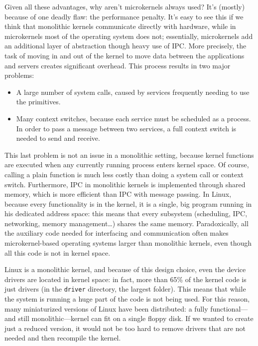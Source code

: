 Given all these advantages, why aren't microkernels always used? It's (mostly) because of one deadly flaw: the performance penalty. It's easy to see this if we think that monolithic kernels communicate directly with hardware, while in microkernels most of the operating system does not; essentially, microkernels add an additional layer of abstraction though heavy use of IPC. More precisely, the task of moving in and out of the kernel to move data between the applications and servers creates significant overhead. This process results in two major problems:
\begin{itemize}
\item A large number of system calls, caused by services frequently needing to use the primitives.
\item Many context switches, because each service must be scheduled as a process. In order to pass a message between two services, a full context switch is needed to send and receive.
\end{itemize}
This last problem is not an issue in a monolithic setting, because kernel functions are executed when any currently running process enters kernel space. Of course, calling a plain function is much less costly than doing a system call or context switch. Furthermore, IPC in monolithic kernels is implemented through shared memory, which is more efficient than IPC with message passing. In Linux, because every functionality is in the kernel, it is a single, big program running in his dedicated address space: this means that every subsystem (scheduling, IPC, networking, memory management\dots) shares the same memory. Paradoxically, all the auxiliary code needed for interfacing and communication often makes microkernel-based operating systems larger than monolithic kernels, even though all this code is not in kernel space. 

Linux is a monolithic kernel, and because of this design choice, even the device drivers are located in kernel space: in fact, more than 65\% of the kernel code is just drivers (in the \verb|driver| directory, the largest folder). This means that while the system is running a huge part of the code is not being used. For this reason, many miniaturized versions of Linux have been distributed: a fully functional---and still monolithic---kernel can fit on a single floppy disk. If we wanted to create just a reduced version, it would not be too hard to remove drivers that are not needed and then recompile the kernel. 

